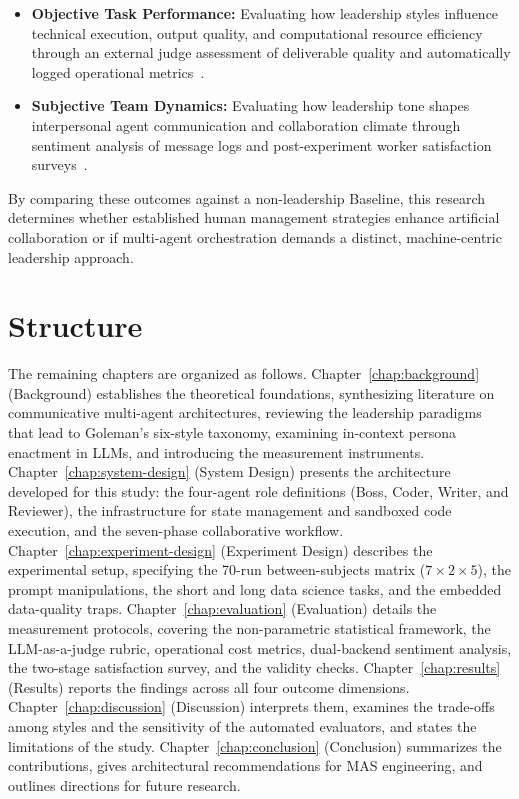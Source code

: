 \begin{itemize}
    \item \textbf{Objective Task Performance:} Evaluating how leadership styles influence technical execution, output quality, and computational resource efficiency through an external judge assessment of deliverable quality and automatically logged operational metrics~\cite{qian2024chatdevcommunicativeagentssoftware, wu2023autogenenablingnextgenllm}.
    \item \textbf{Subjective Team Dynamics:} Evaluating how leadership tone shapes interpersonal agent communication and collaboration climate through sentiment analysis of message logs and post-experiment worker satisfaction surveys~\cite{wageman2005teamdiagnosticsurvey, park2023generativeagentsinteractivesimulacra, li2023camelcommunicativeagentsmind, jiang2024personallminvestigatingabilitylarge, almutairi2025taifaautomatedfeedback}.
\end{itemize}

By comparing these outcomes against a non-leadership Baseline, this research determines whether established human management strategies enhance artificial collaboration or if multi-agent orchestration demands a distinct, machine-centric leadership approach.

\section{Structure}
\label{sec:structure}

The remaining chapters are organized as follows.
Chapter~\ref{chap:background} (Background) establishes the theoretical foundations, synthesizing literature on communicative multi-agent architectures, reviewing the leadership paradigms that lead to Goleman's six-style taxonomy, examining in-context persona enactment in \acp{LLM}, and introducing the measurement instruments.
Chapter~\ref{chap:system-design} (System Design) presents the architecture developed for this study: the four-agent role definitions (Boss, Coder, Writer, and Reviewer), the infrastructure for state management and sandboxed code execution, and the seven-phase collaborative workflow.
Chapter~\ref{chap:experiment-design} (Experiment Design) describes the experimental setup, specifying the 70-run between-subjects matrix ($7 \times 2 \times 5$), the prompt manipulations, the short and long data science tasks, and the embedded data-quality traps.
Chapter~\ref{chap:evaluation} (Evaluation) details the measurement protocols, covering the non-parametric statistical framework, the \ac{LLM}-as-a-judge rubric, operational cost metrics, dual-backend sentiment analysis, the two-stage satisfaction survey, and the validity checks.
Chapter~\ref{chap:results} (Results) reports the findings across all four outcome dimensions.
Chapter~\ref{chap:discussion} (Discussion) interprets them, examines the trade-offs among styles and the sensitivity of the automated evaluators, and states the limitations of the study.
Chapter~\ref{chap:conclusion} (Conclusion) summarizes the contributions, gives architectural recommendations for \ac{MAS} engineering, and outlines directions for future research.

